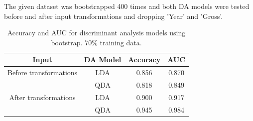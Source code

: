 \documentclass[../../project.tex]{subfiles}
\begin{document}
	The given dataset was bootstrapped 400 times and both DA models were tested before and after input transformations and dropping 'Year' and 'Gross'.
	\begin{table}[h!]
		\centering
		\begin{tabular}{cccc}
			Input & DA Model & Accuracy & AUC \\
			\midrule
			Before transformations
			& LDA & 0.856 & 0.870 \\
		    & QDA & 0.818 & 0.849 \\
			\midrule
			After transformations
			& LDA & 0.900 & 0.917 \\
			& QDA & 0.945 & 0.984 \\
		\end{tabular}
		\caption{Accuracy and AUC for discriminant analysis models using bootstrap. 70\% training data.}
		\label{tab:discanal_table_70}
	\end{table}
\end{document}
